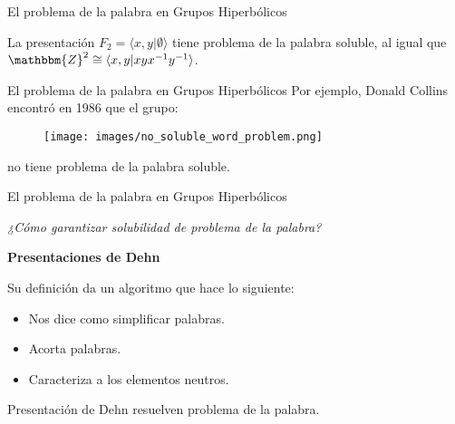 \documentclass[xcolor=dvipsnames,aspectratio=159]{beamer}
\theoremstyle{largebreak}
\newcommand{\bbm}[1]{\ensuremath{\mathbbm{#1}}}
\newcommand{\gen}[1]{\ensuremath{\langle#1\rangle}}
\begin{document}
\begin{frame}{El problema de la palabra en Grupos Hiperbólicos}
    \begin{exa}
        La presentación $F_2=\gen{x,y|\emptyset}$ tiene problema de la palabra soluble\pause, al igual que $\bbm{Z}^2\cong\gen{x,y|xyx^{-1}y^{-1}}$.
    \end{exa}
\end{frame}

\begin{frame}{El problema de la palabra en Grupos Hiperbólicos}
    Por ejemplo, Donald Collins encontró en 1986 que el grupo:
    
    \pause
    
    \begin{figure}
        \begin{center}
            \texttt{[image: images/no\_soluble\_word\_problem.png]}
        \end{center}
    \end{figure}
    
    \pause

    no tiene problema de la palabra soluble.
\end{frame}

\begin{frame}{El problema de la palabra en Grupos Hiperbólicos}

    \begin{center}
        \textit{¿Cómo garantizar solubilidad de problema de la palabra?}
    \end{center}

    \pause

    \begin{center}
        \textbf{Presentaciones de Dehn}
    \end{center}

    \pause

    Su definición da un algoritmo que hace lo siguiente:
    \begin{itemize}
        \item Nos dice como simplificar palabras.
        \item Acorta palabras.
        \item Caracteriza a los elementos neutros.
    \end{itemize}

    \pause

    \begin{center}
        Presentación de Dehn resuelven problema de la palabra.
    \end{center}

\end{frame}
\end{document}
